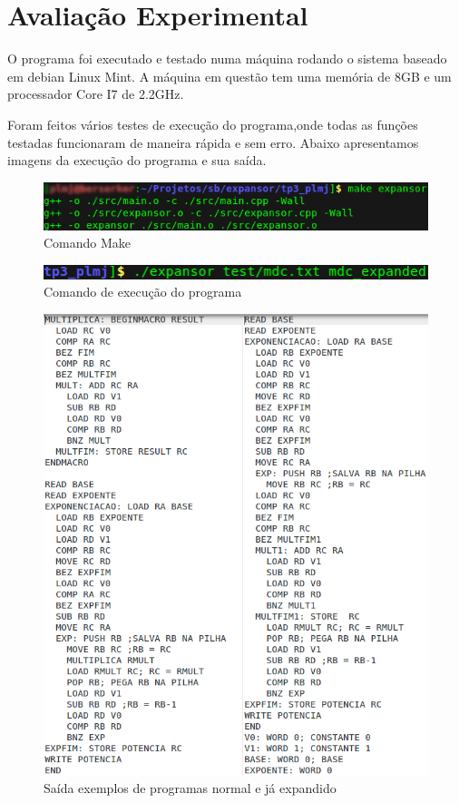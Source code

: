 \documentclass[12pt]{article}
\begin{document}
\section{Avaliação Experimental}
\label{avaliacao_experimenta}
O programa foi executado e testado numa máquina rodando o sistema baseado em
debian Linux Mint. A máquina em questão tem uma memória de 8GB e um processador
Core I7 de 2.2GHz.

Foram feitos vários testes de execução do programa,onde todas as funções
testadas funcionaram de maneira rápida e sem erro. Abaixo apresentamos imagens
da execução do programa e sua saída.

\begin{figure}[h!]
\centering
 \includegraphics[scale=0.5]{./img/make.png}
 \caption{Comando Make}
\end{figure}

\begin{figure}[h!]
\centering
 \includegraphics[scale=0.5]{./img/exec.png}
   \caption{Comando de execução do programa}
\end{figure}

\newpage

\begin{figure}[h!]
\centering
 \includegraphics[scale=0.5]{./img/teste.png}
 \caption{Saída exemplos de programas normal e já expandido}
\end{figure}
\end{document}
